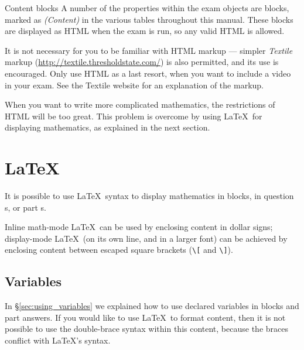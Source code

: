 %
%
%

\begin{chapter}{\label{cha:content_blocks}Content blocks}
  A number of the properties within the exam objects are 
  blocks, marked as \emph{(Content)} in the various tables throughout this
  manual. These blocks are displayed as HTML when the exam is run, so any valid
  HTML is allowed.  
  
  It is not necessary for you to be familiar with HTML markup --- simpler
  \emph{Textile} markup (\url{http://textile.thresholdstate.com/}) is also
  permitted, and its use is encouraged.  Only use HTML as a last resort, \eg
  when you want to include a video in your exam.  See the Textile website for
  an explanation of the markup.

  When you want to write more complicated mathematics, the restrictions of HTML
  will be too great.  This problem is overcome by using \LaTeX\ for displaying
  mathematics, as explained in the next section.

  \section{\label{sec:latex_formatting}\LaTeX}
  It is possible to use \LaTeX\ syntax to display mathematics in
   blocks, \eg in question s, or
  part s.  
  
  Inline math-mode \LaTeX\ can be used by enclosing content in dollar signs;
  display-mode \LaTeX\ (\ie on its own line, and in a larger font) can be
  achieved by enclosing content between escaped square brackets (\verb"\[" and
  \verb"\]").

  \subsection{Variables}
  In \S\ref{sec:using_variables} we explained how to use declared variables in
   blocks and part answers.  If you would like to use
  \LaTeX\ to format content, then it is not possible to use the double-brace
  syntax within this content, because the braces conflict with \LaTeX's syntax.


\end{chapter}
